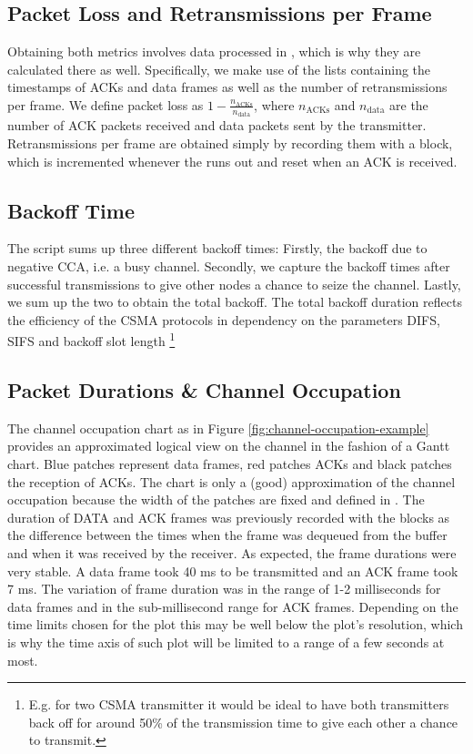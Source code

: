 \subsection{Packet Loss and Retransmissions per Frame}

Obtaining both metrics involves data processed in , which is why they are calculated there as well. Specifically, we make use of the lists containing the timestamps of ACKs and data frames as well as the number of retransmissions per frame. 
We define packet loss as $ 1 - \frac{n_\text{ACKs}}{n_\text{data}} $, where $ n_\text{ACKs} $ and $ n_\text{data} $ are the number of ACK packets received and data packets sent by the transmitter.
Retransmissions per frame are obtained simply by recording them with a  block, which is incremented whenever the  runs out and reset when an ACK is received.

\subsection{Backoff Time}

The script  sums up three different backoff times: Firstly, the backoff due to negative CCA, i.e. a busy channel. Secondly, we capture the backoff times after successful transmissions to give other nodes a chance to seize the channel. Lastly, we sum up the two to obtain the total backoff. The total backoff duration reflects the efficiency of the CSMA protocols in dependency on the parameters DIFS, SIFS and backoff slot length \footnote{E.g. for two CSMA transmitter it would be ideal to have both transmitters back off for around 50\% of the transmission time to give each other a chance to transmit.}

\subsection{Packet Durations \& Channel Occupation}

The channel occupation chart as in Figure \ref{fig:channel-occupation-example} provides an approximated logical view on the channel in the fashion of a Gantt chart. Blue patches represent data frames, red patches ACKs and black patches the reception of ACKs. The chart is only a (good) approximation of the channel occupation because the width of the patches are fixed and defined in . The duration of DATA and ACK frames was previously recorded with the  blocks as the difference between the times when the frame was dequeued from the buffer and when it was received by the receiver. As expected, the frame durations were very stable. A data frame took 40 ms to be transmitted and an ACK frame took 7 ms. The variation of frame duration was in the range of 1-2  milliseconds for data frames and in the sub-millisecond range for ACK frames. Depending on the time limits chosen for the plot this may be well below the plot's resolution, which is why the time axis of such plot will be limited to a range of a few seconds at most.

